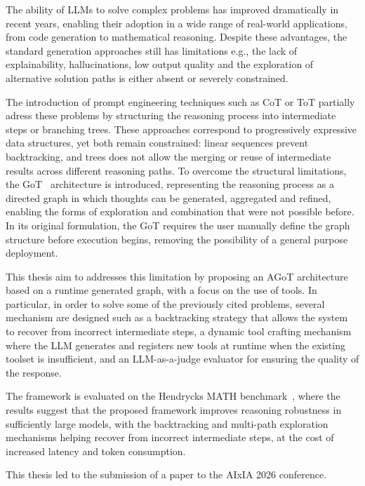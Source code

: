\documentclass[12pt,a4paper,openright,twoside]{book}
\begin{document}
The ability of \acp{LLM} to solve complex problems has improved dramatically
in recent years, enabling their adoption in a wide range of real-world
applications, from code generation to mathematical reasoning.
% 
Despite these advantages, the standard generation approaches still has limitations e.g., the lack of explainability,
hallucinations, low output quality and the exploration of alternative solution paths is either absent or severely constrained.

The introduction of prompt engineering techniques such as \ac{CoT} or \ac{ToT} partially adress these problems by structuring the reasoning process into intermediate steps or branching trees.
%
These approaches correspond to progressively expressive data structures,
yet both remain constrained: linear sequences prevent backtracking,
and trees does not allow the merging or reuse of intermediate results across
different reasoning paths.
%
To overcome the structural limitations, the \ac{GoT}~\cite{besta2024got} architecture is introduced, representing the reasoning process as a directed graph in which thoughts can be generated, aggregated and refined, enabling the forms of exploration and combination that were not possible before. 
%
In its original formulation, the \ac{GoT} requires the user manually define the graph structure before execution begins, removing the possibility of a general purpose deployment. 

This thesis aim to addresses this limitation by proposing an \ac{AGoT} architecture based on a runtime generated graph, with a focus on the use of tools.
%
In particular, in order to solve some of the previously cited problems, several mechanism are designed such as a backtracking strategy that allows the system
to recover from incorrect intermediate steps, a dynamic tool crafting
mechanism where the \ac{LLM} generates and registers new tools
at runtime when the existing toolset is insufficient, and an
\ac{LLM}-as-a-judge evaluator for ensuring the quality of the response. 

The framework is evaluated on the Hendrycks MATH benchmark~\cite{hendrycksmath2021}, 
where the results suggest that the proposed framework improves reasoning robustness in sufficiently large models, with the backtracking and multi-path
exploration mechanisms helping recover from incorrect intermediate steps,
at the cost of increased latency and token consumption.

This thesis led to the submission of a paper to the AIxIA 2026 conference.
\end{document}
